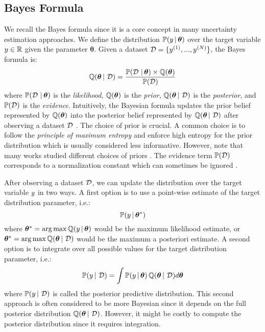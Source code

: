 \subsection{Bayes Formula} We recall the Bayes formula since it is a core concept in many uncertainty estimation approaches.
We define the distribution $\mathbb{P}(y \,|\, \bm{\theta})$ over the target variable $y \in \operatorname{\mathbb{R}}$ given the parameter $\bm{\theta}$.
Given a dataset $\operatorname{\mathcal{D}}=\{y^{(1)}, ..., y^{(N)}\}$, the Bayes formula is:
\begin{equation}
    \operatorname{\mathbb{Q}}(\bm{\theta} \,|\, \operatorname{\mathcal{D}}) = \frac{\mathbb{P}(\operatorname{\mathcal{D}} \,|\, \bm{\theta}) \times \operatorname{\mathbb{Q}}(\bm{\theta})}{\mathbb{P}(\operatorname{\mathcal{D}})}
\end{equation}
where $\mathbb{P}(\operatorname{\mathcal{D}} \,|\, \bm{\theta})$ is the \emph{likelihood}, $\operatorname{\mathbb{Q}}(\bm{\theta})$ is the \emph{prior}, $\operatorname{\mathbb{Q}}(\bm{\theta} \,|\, \operatorname{\mathcal{D}})$ is the \emph{posterior}, and $\mathbb{P}(\operatorname{\mathcal{D}})$ is the \emph{evidence}.
Intuitively, the Bayesian formula updates the prior belief represented by $\operatorname{\mathbb{Q}}(\bm{\theta})$ into the posterior belief represented by $\operatorname{\mathbb{Q}}(\bm{\theta} \,|\, \operatorname{\mathcal{D}})$ after observing a dataset $\operatorname{\mathcal{D}}$ \cite{bishop}.
The choice of prior is crucial. A common choice is to follow the \emph{principle of maximum entropy} \citep{maximum-entropy-principle} and enforce high entropy for the prior distribution which is usually considered less informative. However, note that many works studied different choices of priors \cite{jeffreys1946prior, silvestro2020prior}.
The evidence term $\mathbb{P}(\operatorname{\mathcal{D}})$ corresponds to a normalization constant which can sometimes be ignored \cite{bishop}.

After observing a dataset $\operatorname{\mathcal{D}}$, we can update the distribution over the target variable $y$ in two ways.
A first option is to use a point-wise estimate of the target distribution parameter, i.e.:
\begin{equation}
    \mathbb{P}(y \,|\, \bm{\theta}^*)
\end{equation}
where $\bm{\theta}^*=\operatorname*{arg\,max}\operatorname{\mathbb{Q}}(y \,|\, \bm{\theta})$ would be the maximum likelihood estimate, or $\bm{\theta}^*=\operatorname*{arg\,max}\operatorname{\mathbb{Q}}(\bm{\theta} \,|\, \operatorname{\mathcal{D}})$ would be the maximum a posteriori estimate.
A second option is to integrate over all possible values for the target distribution parameter, i.e.:
\begin{equation}
    \label{eq:posterior_predictive}
    \mathbb{P}(y \,|\, \operatorname{\mathcal{D}}) = \int \mathbb{P}(y \,|\, \bm{\theta}) \operatorname{\mathbb{Q}}(\bm{\theta} \,|\, \operatorname{\mathcal{D}}) d\bm{\theta}
\end{equation}
where $\mathbb{P}(y \,|\, \operatorname{\mathcal{D}})$ is called the posterior predictive distribution. 
This second approach is often considered to be more Bayesian since it depends on the full posterior distribution $\operatorname{\mathbb{Q}}(\bm{\theta} \,|\, \operatorname{\mathcal{D}})$.
However, it might be costly to compute the posterior distribution since it requires integration.


